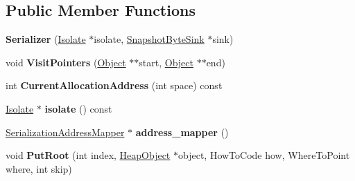 \subsection*{Public Member Functions}
\begin{DoxyCompactItemize}
\item 
\hypertarget{classv8_1_1internal_1_1_serializer_aaceee205adfe86e70640d2d50ad852c8}{}{\bfseries Serializer} (\hyperlink{classv8_1_1internal_1_1_isolate}{Isolate} $\ast$isolate, \hyperlink{classv8_1_1internal_1_1_snapshot_byte_sink}{Snapshot\+Byte\+Sink} $\ast$sink)\label{classv8_1_1internal_1_1_serializer_aaceee205adfe86e70640d2d50ad852c8}

\item 
\hypertarget{classv8_1_1internal_1_1_serializer_a5a56c9bfe687cdffc1dec6eab52ddb5d}{}void {\bfseries Visit\+Pointers} (\hyperlink{classv8_1_1internal_1_1_object}{Object} $\ast$$\ast$start, \hyperlink{classv8_1_1internal_1_1_object}{Object} $\ast$$\ast$end)\label{classv8_1_1internal_1_1_serializer_a5a56c9bfe687cdffc1dec6eab52ddb5d}

\item 
\hypertarget{classv8_1_1internal_1_1_serializer_a3957fe111494801d0754223916722387}{}int {\bfseries Current\+Allocation\+Address} (int space) const \label{classv8_1_1internal_1_1_serializer_a3957fe111494801d0754223916722387}

\item 
\hypertarget{classv8_1_1internal_1_1_serializer_a2b71e58ac55ccc7036d536a910b4623e}{}\hyperlink{classv8_1_1internal_1_1_isolate}{Isolate} $\ast$ {\bfseries isolate} () const \label{classv8_1_1internal_1_1_serializer_a2b71e58ac55ccc7036d536a910b4623e}

\item 
\hypertarget{classv8_1_1internal_1_1_serializer_a4bd01750272b44695572adafc50b1933}{}\hyperlink{classv8_1_1internal_1_1_serialization_address_mapper}{Serialization\+Address\+Mapper} $\ast$ {\bfseries address\+\_\+mapper} ()\label{classv8_1_1internal_1_1_serializer_a4bd01750272b44695572adafc50b1933}

\item 
\hypertarget{classv8_1_1internal_1_1_serializer_af56867deddb051bccdcd959b61ff4def}{}void {\bfseries Put\+Root} (int index, \hyperlink{classv8_1_1internal_1_1_heap_object}{Heap\+Object} $\ast$object, How\+To\+Code how, Where\+To\+Point where, int skip)\label{classv8_1_1internal_1_1_serializer_af56867deddb051bccdcd959b61ff4def}

\end{DoxyCompactItemize}
